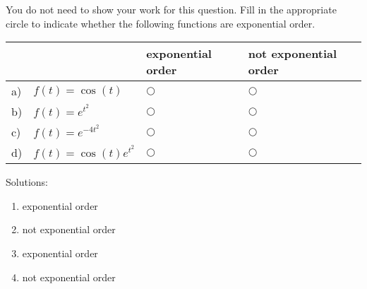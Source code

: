 \ifnum {}  
\question[1] You do not need to show your work for this question. Fill in the appropriate circle to indicate whether the following functions are exponential order. 
\vspace{-0.4cm}
\setlength{\extrarowheight}{0.20cm}
\begin{center}
\hspace{-.9cm}\begin{tabular}{ p{0.20cm} p{4cm} p{3.5cm} p{4cm} }
    & & exponential order &  not exponential order  \\[2pt] \hline 
    a) & $f(t) = \cos(t)$ & $\bigcirc$  & $\bigcirc$ \\[8pt]  
    b) & $f(t) = e^{t^2}$  & $\bigcirc$  & $\bigcirc$ \\[8pt] 
    c) & $f(t) = e^{-4t^2}$  & $\bigcirc$  & $\bigcirc$ \\[8pt] 
    d) & $f(t) = \cos(t)e^{t^2}$  & $\bigcirc$  & $\bigcirc$ \\[8pt] 
    \hline
\end{tabular}
\end{center}
\setlength{\extrarowheight}{0.0cm}
\ifnum {} {\color{DarkBlue} Solutions: 
\begin{enumerate}[label=(\alph*)]
    \item exponential order
    \item not exponential order
    \item exponential order
    \item not exponential order
\end{enumerate}
}
\fi
\vspace{-6pt} 
\fi 

